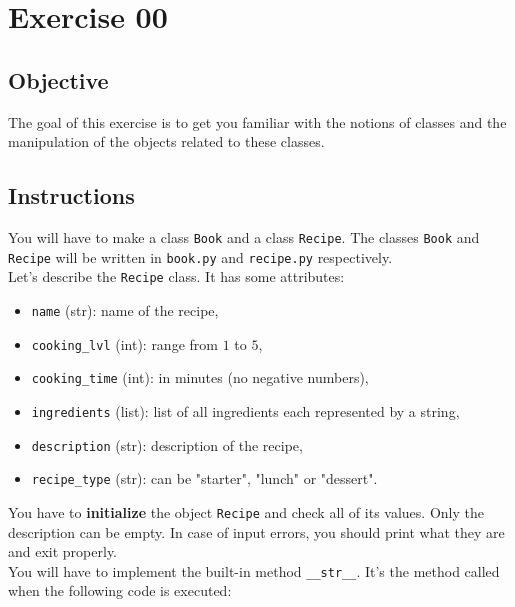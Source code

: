\chapter{Exercise 00}
\makeheaderfilesforbidden

\section*{Objective}
The goal of this exercise is to get you familiar with the notions of
classes and the manipulation of the objects related to these classes.

\section*{Instructions}
You will have to make a class \texttt{Book} and a class \texttt{Recipe}.
The classes \texttt{Book} and \texttt{Recipe} will be written in 
\texttt{book.py} and \texttt{recipe.py} respectively.\\
\newline
Let's describe the \texttt{Recipe} class. It has some attributes:
\begin{itemize}
  \item \texttt{name} (str): name of the recipe,
  \item \texttt{cooking\_lvl} (int): range from $1$ to $5$,
  \item \texttt{cooking\_time} (int): in minutes (no negative numbers),
  \item \texttt{ingredients} (list): list of all ingredients each represented by a string,
  \item \texttt{description} (str): description of the recipe,
  \item \texttt{recipe\_type} (str): can be "starter", "lunch" or "dessert".
\end{itemize}
You have to \textbf{initialize} the object \texttt{Recipe} and check all of its values. Only the description can be empty.
In case of input errors, you should print what they are and exit properly.\\
\newline
You will have to implement the built-in method \texttt{\_\_str\_\_}.
It's the method called when the following code is executed:\\
